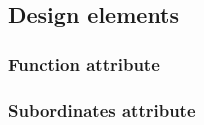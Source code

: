 		\subsection{Design elements} \label{s:template-vpv:design-elements}
			\begin{comment}
				Design entities: types of constituents of a system: subsystems, components, modules; ports and (provided
				and required) interfaces; also libraries, frameworks, software repositories, catalogs, and templates.
				Design relationships: composition, use, and generalization. The Composition viewpoint supports the
				recording of the part-whole relationships between design entities using realization, dependency,
				aggregation, composition, and generalization relationships. Additional design relationships are required and
				provided (interfaces), and the attachment of ports to components.
				Design attributes: For each design entity, the viewpoint provides a reference to a detailed description via
				the identification attribute. The attribute descriptions for identification, type, purpose, function, and
				definition attribute should be utilized.
			\end{comment}
		
			\subsubsection{Function attribute} \label{s:template-vpv:function-attribute}
				\begin{comment}
					A statement of what the entity does. The function attribute states the transformation applied by the entity to
					its inputs to produce the output. In the case of a data entity, this attribute states the type of information
					stored or transmitted by the entity.
					NOTE—This design attribute is retained for compatibility with IEEE Std 1016-1998.
				\end{comment}
			
			\subsubsection{Subordinates attribute} \label{s:template-vpv:subordinates-attribute}
				\begin{comment}
					The identification of all entities composing this entity. The subordinates attribute identifies the “composed
					of” relationship for an entity. This information is used to trace requirements to design entities and to
					identify parent/child structural relationships through a design subject.
					NOTE—This design attribute is retained for compatibility with IEEE Std 1016-1998. An equivalent capability is
					available through the composition relationship.
				\end{comment}
			
